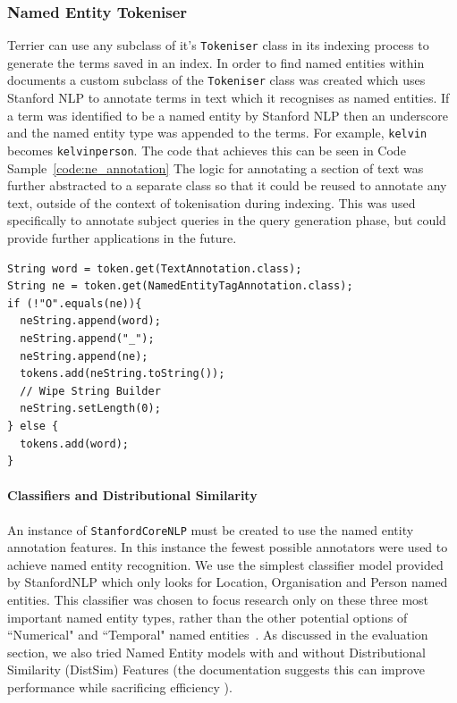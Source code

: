 \documentclass{l4proj}
\newcommand{\code}[1]{\texttt{#1}}
\newenvironment{codelisting}{\captionsetup{type=listing}}{}
\begin{document}
\subsubsection{Named Entity Tokeniser}
Terrier can use any subclass of it's \code{Tokeniser} class in its indexing process to generate the terms saved in an index. In order to find named entities within documents a custom subclass of the \code{Tokeniser} class was created which uses Stanford NLP to annotate terms in text which it recognises as named entities.
If a term was identified to be a named entity by Stanford NLP then an underscore and the named entity type was appended to the terms. For example, 
\code{kelvin} becomes \code{kelvin\textunderscore person}. The code that achieves this can be seen in Code Sample~\ref{code:ne_annotation}
The logic for annotating a section of text was further abstracted to a separate class so that it could be reused to annotate any text, outside of the context of tokenisation during indexing. This was used specifically to annotate subject queries in the query generation phase, but could provide further applications in the future.
\begin{codelisting}
\begin{verbatim}
String word = token.get(TextAnnotation.class);
String ne = token.get(NamedEntityTagAnnotation.class);
if (!"O".equals(ne)){
  neString.append(word);
  neString.append("_");
  neString.append(ne);
  tokens.add(neString.toString());
  // Wipe String Builder
  neString.setLength(0);
} else {
  tokens.add(word);
}
\end{verbatim}
\label{code:ne_annotation}
\end{codelisting}

\paragraph{Classifiers and Distributional Similarity} \label{classifiers}
An instance of \code{StanfordCoreNLP} must be created to use the named entity annotation features.
In this instance the fewest possible annotators were used to achieve named entity recognition.
We use the simplest classifier model provided by StanfordNLP which only looks for Location, Organisation and Person named entities. This classifier was chosen to focus research only on these three most important named entity types, rather than the other potential options of ``Numerical" and ``Temporal" named entities~\cite{neroptions}.
As discussed in the evaluation section, we also tried Named Entity models with and without Distributional Similarity (DistSim) Features (the documentation suggests this can improve performance while sacrificing efficiency \cite{distsimfeatures}).
\end{document}
